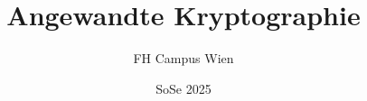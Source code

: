 \documentclass{book}
\begin{document}
\frontmatter

\title{Angewandte Kryptographie}
\author{FH Campus Wien}
\date{SoSe 2025}

\maketitle
\tableofcontents

\mainmatter










\backmatter



\printindex
\end{document}
